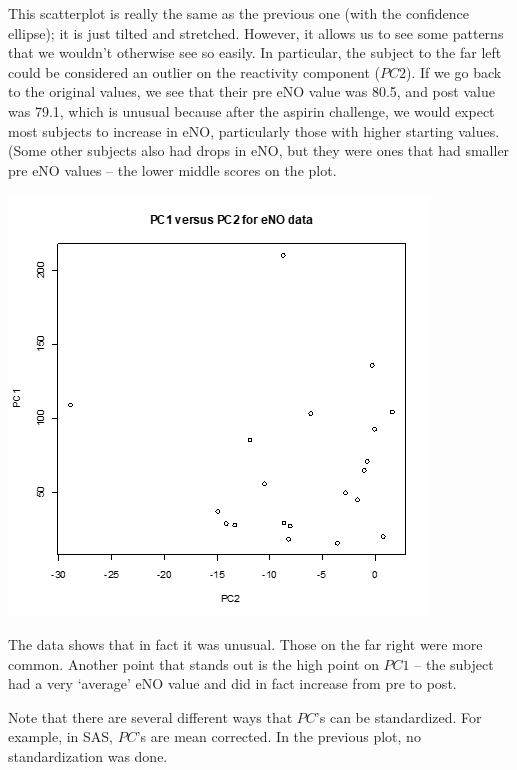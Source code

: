 \documentclass[
  9pt,
  ignorenonframetext,
]{beamer}
\begin{document}
\begin{frame}{}
\protect\hypertarget{section-13}{}
This scatterplot is really the same as the previous one (with the
confidence ellipse); it is just tilted and stretched. However, it allows
us to see some patterns that we wouldn't otherwise see so easily. In
particular, the subject to the far left could be considered an outlier
on the reactivity component (\(PC2\)). If we go back to the original
values, we see that their pre eNO value was 80.5, and post value was
79.1, which is unusual because after the aspirin challenge, we would
expect most subjects to increase in eNO, particularly those with higher
starting values. (Some other subjects also had drops in eNO, but they
were ones that had smaller pre eNO values -- the lower middle scores on
the plot.

\tiny

\begin{center}\includegraphics[width=0.5\linewidth]{figs_L2/L2-f20} \end{center}

\tiny
\end{frame}

\begin{frame}{}
\protect\hypertarget{section-14}{}
The data shows that in fact it was unusual. Those on the far right were
more common. Another point that stands out is the high point on \(PC1\)
-- the subject had a very `average' eNO value and did in fact increase
from pre to post.

Note that there are several different ways that \(PC\)'s can be
standardized. For example, in SAS, \(PC\)'s are mean corrected. In the
previous plot, no standardization was done.
\end{frame}
\end{document}
